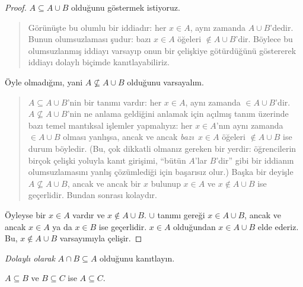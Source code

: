 \documentclass[../../../include/open-logic-section]{subfiles}
\begin{document}
\begin{proof}
  $A \subseteq A \cup B$ olduğunu göstermek istiyoruz.
  \begin{quote}
    Görünüşte bu olumlu bir iddiadır: her $x \in A$, aynı zamanda $A
    \cup B$'dedir. Bunun olumsuzlaması şudur: bazı $x \in A$ öğeleri
    $\notin A \cup B$'dir. Böylece bu olumsuzlanmış iddiayı varsayıp onun
    bir çelişkiye götürdüğünü göstererek iddiayı dolaylı biçimde
    kanıtlayabiliriz.
    \end{quote}
  Öyle olmadığını, yani $A \nsubseteq A \cup B$ olduğunu varsayalım.
  \begin{quote}
    $A \subseteq A \cup B$'nin bir tanımı vardır: her $x \in A$, aynı
    zamanda $\in A \cup B$'dir. $A \nsubseteq A \cup B$'nin ne anlama
    geldiğini anlamak için açılmış tanım üzerinde bazı temel mantıksal
    işlemler yapmalıyız: her $x \in A$'nın aynı zamanda $\in A \cup B$
    olması yanlışsa, ancak ve ancak \emph{bazı}~$x \in A$ öğeleri
    $\notin A \cup B$ ise durum böyledir. (Bu, çok dikkatli olmanız gereken bir
    yerdir: öğrencilerin birçok çelişki yoluyla kanıt girişimi, ``bütün
    $A$'lar $B$'dir'' gibi bir iddianın olumsuzlamasını yanlış çözümlediği
    için başarısız olur.) Başka bir deyişle $A \nsubseteq A \cup B$,
    ancak ve ancak bir $x$ bulunup $x \in A$ ve $x \notin A \cup B$ ise
    geçerlidir. Bundan sonrası kolaydır.
  \end{quote}
  Öyleyse bir $x \in A$ vardır ve $x \notin A \cup B$. $\cup$ tanımı
  gereği $x \in A \cup B$, ancak ve ancak $x \in
  A$ ya da $x \in B$ ise geçerlidir. $x \in A$ olduğundan $x \in A
  \cup B$ elde ederiz. Bu, $x \notin A \cup B$ varsayımıyla çelişir.
\end{proof}

\begin{prob}
\emph{Dolaylı olarak} $A \cap B \subseteq A$ olduğunu kanıtlayın.
\end{prob}

\begin{prop}
$A \subseteq B$ ve $B \subseteq C$ ise $A \subseteq C$.
\end{prop}
\end{document}
